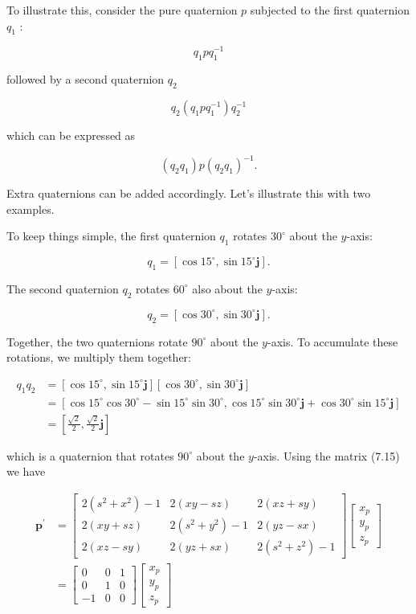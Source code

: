To illustrate this, consider the pure quaternion $p$ subjected to the first quaternion $q_{1}$ :

$$
q_{1} p q_{1}^{-1}
$$

followed by a second quaternion $q_{2}$

$$
q_{2}\left(q_{1} p q_{1}^{-1}\right) q_{2}^{-1}
$$

which can be expressed as

$$
\left(q_{2} q_{1}\right) p\left(q_{2} q_{1}\right)^{-1} .
$$

Extra quaternions can be added accordingly. Let's illustrate this with two examples.

To keep things simple, the first quaternion $q_{1}$ rotates $30^{\circ}$ about the $y$-axis:

$$
q_{1}=\left[\cos 15^{\circ}, \sin 15^{\circ} \mathbf{j}\right] .
$$

The second quaternion $q_{2}$ rotates $60^{\circ}$ also about the $y$-axis:

$$
q_{2}=\left[\cos 30^{\circ}, \sin 30^{\circ} \mathbf{j}\right] .
$$

Together, the two quaternions rotate $90^{\circ}$ about the $y$-axis. To accumulate these rotations, we multiply them together:

$$
\begin{aligned}
q_{1} q_{2} & =\left[\cos 15^{\circ}, \sin 15^{\circ} \mathbf{j}\right]\left[\cos 30^{\circ}, \sin 30^{\circ} \mathbf{j}\right] \\
& =\left[\cos 15^{\circ} \cos 30^{\circ}-\sin 15^{\circ} \sin 30^{\circ}, \cos 15^{\circ} \sin 30^{\circ} \mathbf{j}+\cos 30^{\circ} \sin 15^{\circ} \mathbf{j}\right] \\
& =\left[\frac{\sqrt{2}}{2}, \frac{\sqrt{2}}{2} \mathbf{j}\right]
\end{aligned}
$$

which is a quaternion that rotates $90^{\circ}$ about the $y$-axis. Using the matrix (7.15) we have

$$
\begin{aligned}
\mathbf{p}^{\prime} & =\left[\begin{array}{ccc}
2\left(s^{2}+x^{2}\right)-1 & 2(x y-s z) & 2(x z+s y) \\
2(x y+s z) & 2\left(s^{2}+y^{2}\right)-1 & 2(y z-s x) \\
2(x z-s y) & 2(y z+s x) & 2\left(s^{2}+z^{2}\right)-1
\end{array}\right]\left[\begin{array}{l}
x_{p} \\
y_{p} \\
z_{p}
\end{array}\right] \\
& =\left[\begin{array}{ccc}
0 & 0 & 1 \\
0 & 1 & 0 \\
-1 & 0 & 0
\end{array}\right]\left[\begin{array}{c}
x_{p} \\
y_{p} \\
z_{p}
\end{array}\right]
\end{aligned}
$$

